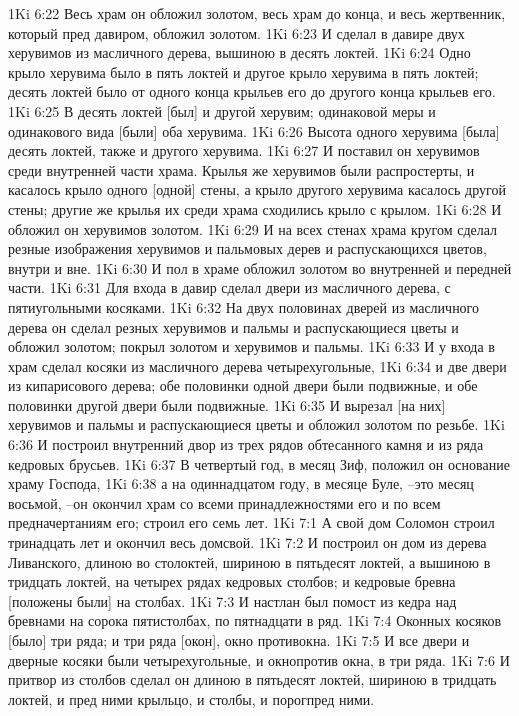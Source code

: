 1Ki 6:22  Весь храм он обложил золотом, весь храм до конца, и весь жертвенник, который пред давиром, обложил золотом.
1Ki 6:23  И сделал в давире двух херувимов из масличного дерева, вышиною в десять локтей.
1Ki 6:24  Одно крыло херувима было в пять локтей и другое крыло херувима в пять локтей; десять локтей было от одного конца крыльев его до другого конца крыльев его.
1Ki 6:25  В десять локтей [был] и другой херувим; одинаковой меры и одинакового вида [были] оба херувима.
1Ki 6:26  Высота одного херувима [была] десять локтей, также и другого херувима.
1Ki 6:27  И поставил он херувимов среди внутренней части храма. Крылья же херувимов были распростерты, и касалось крыло одного [одной] стены, а крыло другого херувима касалось другой стены; другие же крылья их среди храма сходились крыло с крылом.
1Ki 6:28  И обложил он херувимов золотом.
1Ki 6:29  И на всех стенах храма кругом сделал резные изображения херувимов и пальмовых дерев и распускающихся цветов, внутри и вне.
1Ki 6:30  И пол в храме обложил золотом во внутренней и передней части.
1Ki 6:31  Для входа в давир сделал двери из масличного дерева, с пятиугольными косяками.
1Ki 6:32  На двух половинах дверей из масличного дерева он сделал резных херувимов и пальмы и распускающиеся цветы и обложил золотом; покрыл золотом и херувимов и пальмы.
1Ki 6:33  И у входа в храм сделал косяки из масличного дерева четырехугольные,
1Ki 6:34  и две двери из кипарисового дерева; обе половинки одной двери были подвижные, и обе половинки другой двери были подвижные.
1Ki 6:35  И вырезал [на них] херувимов и пальмы и распускающиеся цветы и обложил золотом по резьбе.
1Ki 6:36  И построил внутренний двор из трех рядов обтесанного камня и из ряда кедровых брусьев.
1Ki 6:37  В четвертый год, в месяц Зиф, положил он основание храму Господа,
1Ki 6:38  а на одиннадцатом году, в месяце Буле, --это месяц восьмой, --он окончил храм со всеми принадлежностями его и по всем предначертаниям его; строил его семь лет.
1Ki 7:1  А свой дом Соломон строил тринадцать лет и окончил весь домсвой.
1Ki 7:2  И построил он дом из дерева Ливанского, длиною во столоктей, шириною в пятьдесят локтей, а вышиною в тридцать локтей, на четырех рядах кедровых столбов; и кедровые бревна [положены были] на столбах.
1Ki 7:3  И настлан был помост из кедра над бревнами на сорока пятистолбах, по пятнадцати в ряд.
1Ki 7:4  Оконных косяков [было] три ряда; и три ряда [окон], окно противокна.
1Ki 7:5  И все двери и дверные косяки были четырехугольные, и окнопротив окна, в три ряда.
1Ki 7:6  И притвор из столбов сделал он длиною в пятьдесят локтей, шириною в тридцать локтей, и пред ними крыльцо, и столбы, и порогпред ними.
